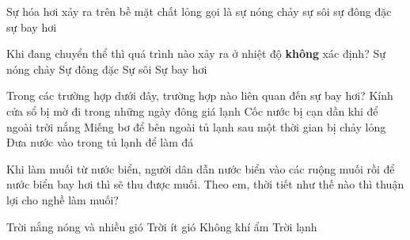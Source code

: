 \begin{ex}
	Sự hóa hơi xảy ra trên bề mặt chất lỏng gọi là
	\choice
	{sự nóng chảy}
	{sự sôi}
	{sự đông đặc}
	{\True sự bay hơi}
	\end{ex}
\begin{ex} 
	Khi đang chuyển thể thì quá trình nào xảy ra ở nhiệt độ \textbf{không} xác định?
	\choice
	{Sự nóng chảy}
	{Sự đông đặc}
	{Sự sôi}
	{\True Sự bay hơi}
\end{ex}
\begin{ex}
	Trong các trường hợp dưới đây, trường hợp nào liên quan đến sự bay hơi?
	\choice
	{Kính cửa sổ bị mờ đi trong những ngày đông giá lạnh}
	{\True Cốc nước bị cạn dần khi để ngoài trời nắng}
	{Miếng bơ để bên ngoài tủ lạnh sau một thời gian bị chảy lỏng}
	{Đưa nước vào trong tủ lạnh để làm đá}
	\end{ex}
\begin{ex}
	Khi làm muối từ nước biển, người dân dẫn nước biển vào các ruộng muối rồi để nước biển bay hơi thì sẽ thu được muối. Theo em, thời tiết như thế nào thì thuận lợi cho nghề làm muối?
	
	\choice
	{\True Trời nắng nóng và nhiều gió}
	{Trời ít gió}
	{Không khí ẩm}
	{Trời lạnh}
	\end{ex}
